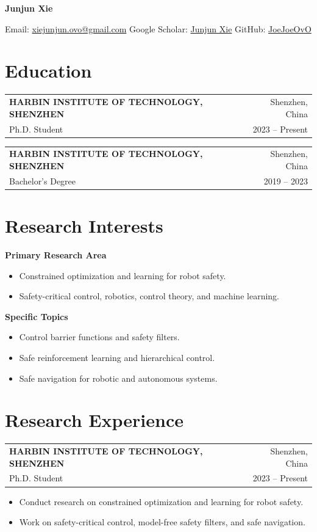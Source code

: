 \documentclass[10pt,letterpaper]{article}
\makeatletter
\newcommand{\cvname}[1]{
  \begin{center}
    {\LARGE\bfseries #1}
  \end{center}
  \vspace{-8pt}
}
\newcommand{\cvcontact}[1]{
  \begin{center}
    \small #1
  \end{center}
  \vspace{2pt}
}
\newcommand{\entry}[4]{
  \begin{tabular*}{\textwidth}{@{}l@{\extracolsep{\fill}}r@{}}
    \textbf{\MakeUppercase{#1}} & #2 \\
    #3 & #4 \\
  \end{tabular*}
  \vspace{2pt}
}
\newcommand{\cvline}[1]{
  #1\par
  \vspace{2pt}
}
\newenvironment{cvitems}{
  \begin{itemize}[
    leftmargin=1.55em,
    itemsep=1pt,
    topsep=2pt,
    parsep=0pt,
    partopsep=0pt
  ]
}{
  \end{itemize}
}
\makeatother
\begin{document}
\cvname{Junjun Xie}
\cvcontact{
  Email: \href{mailto:xiejunjun.ovo@gmail.com}{xiejunjun.ovo@gmail.com}
  \quad
  Google Scholar: \href{https://scholar.google.com/citations?user=iD5b5lUAAAAJ\&hl=en}{Junjun Xie}
  \quad
  GitHub: \href{https://github.com/JoeJoeOvO/}{JoeJoeOvO}
}

\section{Education}

\entry
  {Harbin Institute of Technology, Shenzhen}
  {Shenzhen, China}
  {Ph.D. Student}
  {2023 -- Present}

\entry
  {Harbin Institute of Technology, Shenzhen}
  {Shenzhen, China}
  {Bachelor's Degree}
  {2019 -- 2023}

\section{Research Interests}

\cvline{\textbf{Primary Research Area}}
\begin{cvitems}
  \item Constrained optimization and learning for robot safety.
  \item Safety-critical control, robotics, control theory, and machine learning.
\end{cvitems}

\cvline{\textbf{Specific Topics}}
\begin{cvitems}
  \item Control barrier functions and safety filters.
  \item Safe reinforcement learning and hierarchical control.
  \item Safe navigation for robotic and autonomous systems.
\end{cvitems}

\section{Research Experience}

\entry
  {Harbin Institute of Technology, Shenzhen}
  {Shenzhen, China}
  {Ph.D. Student}
  {2023 -- Present}
\begin{cvitems}
  \item Conduct research on constrained optimization and learning for robot safety.
  \item Work on safety-critical control, model-free safety filters, and safe navigation.
\end{cvitems}
\end{document}
